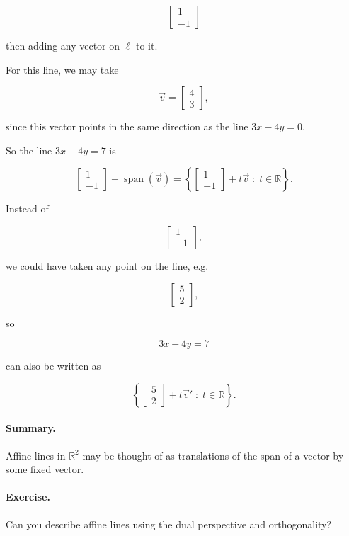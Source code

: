 $$
\begin{bmatrix}
1\\
-1
\end{bmatrix}
$$

then adding any vector on $\ell$ to it.

For this line, we may take

$$
\vec v=
\begin{bmatrix}
4\\
3
\end{bmatrix},
$$

since this vector points in the same direction as the line $3x-4y=0$.

So the line $3x-4y=7$ is

$$
\begin{bmatrix}
1\\
-1
\end{bmatrix}
+
\operatorname{span}(\vec v)
=
\left\{
\begin{bmatrix}
1\\
-1
\end{bmatrix}
+
t\vec v
\;:\;
t\in\mathbb{R}
\right\}.
$$

Instead of

$$
\begin{bmatrix}
1\\
-1
\end{bmatrix},
$$

we could have taken any point on the line, e.g.

$$
\begin{bmatrix}
5\\
2
\end{bmatrix},
$$

so

$$
3x-4y=7
$$

can also be written as

$$
\left\{
\begin{bmatrix}
5\\
2
\end{bmatrix}
+
t\vec v'
\;:\;
t\in\mathbb{R}
\right\}.
$$

\paragraph{Summary.}
Affine lines in $\mathbb{R}^2$ may be thought of as translations of the span
of a vector by some fixed vector.

\paragraph{Exercise.}
Can you describe affine lines using the dual perspective and orthogonality?

